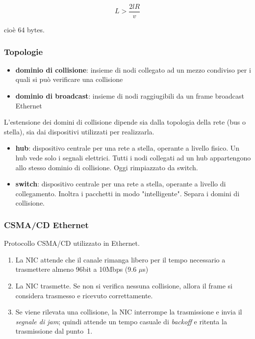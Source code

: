 \documentclass[12pt,a4paper]{article}
\begin{document}
$$ L > \frac{2 l R}{v} $$

cioè 64 bytes.

\subsubsection{Topologie}
\begin{itemize}
  \item \textbf{dominio di collisione}: insieme di nodi collegato ad un
    mezzo condiviso per i quali si può verificare una collisione
  \item \textbf{dominio di broadcast}: insieme di nodi raggiugibili da
    un frame broadcast Ethernet
\end{itemize}

L'estensione dei domini di collisione dipende sia dalla topologia della
rete (bus o stella), sia dai dispositivi utilizzati per realizzarla.

\begin{itemize}
  \item \textbf{hub}: dispositivo centrale per una rete a stella,
    operante a livello fisico. Un hub vede solo i segnali elettrici.
    Tutti i nodi collegati ad un hub appartengono allo stesso dominio di
    collisione. Oggi rimpiazzato da switch.
  \item \textbf{switch}: dispositivo centrale per una rete a stella,
    operante a livello di collegamento. Inoltra i pacchetti in modo
    "intelligente". Separa i domini di collisione.
\end{itemize}

\subsubsection{CSMA/CD Ethernet}
Protocollo CSMA/CD utilizzato in Ethernet.

\begin{enumerate}
  \item La NIC attende che il canale rimanga libero per il tempo
    necessario a trasmettere almeno 96bit a 10Mbps (9.6 $\mu$s)
  \item La NIC trasmette. Se non si verifica nessuna collisione, allora
    il frame si considera trasmesso e ricevuto correttamente.
  \item Se viene rilevata una collisione, la NIC interrompe la
    trasmissione e invia il \emph{segnale di jam}; quindi attende un
    tempo casuale di \emph{backoff} e ritenta la trasmissione dal
    punto~1.
\end{enumerate}
\end{document}
